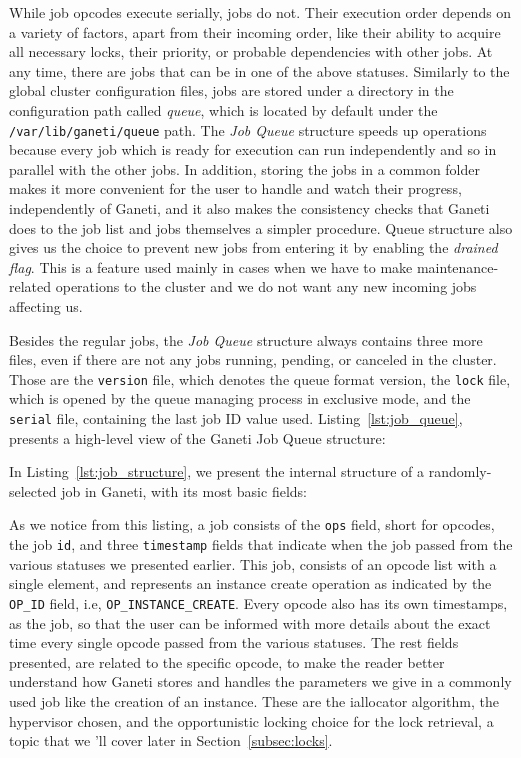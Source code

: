 While job opcodes execute serially, jobs do not. Their execution order depends
on a variety of factors, apart from their incoming order, like their ability to
acquire all necessary locks, their priority, or probable dependencies with
other jobs. At any time, there are jobs that can be in one of the above
statuses. Similarly to the global cluster configuration files, jobs are stored
under a directory in the configuration path called \emph{queue}, which is
located by default under the \texttt{/var/lib/ganeti/queue} path.
The \emph{Job Queue} structure speeds
up operations because every job which is ready for execution can run
independently and so in parallel with the other jobs. In addition, storing
the jobs in a common folder makes it more convenient for the user to handle
and watch their progress, independently of Ganeti, and it also makes the
consistency checks that Ganeti does to the job list and jobs themselves a
simpler procedure. Queue structure also gives us the choice to prevent new
jobs from entering it by enabling the \emph{drained flag}. This is a feature
used mainly in cases when we have to make maintenance-related operations to
the cluster and we do not want any new incoming jobs affecting us.

Besides the regular jobs, the \emph{Job Queue} structure always contains three
more files, even if there are not any jobs running, pending, or canceled in
the cluster. Those are the \texttt{version} file, which denotes the queue
format version, the \texttt{lock} file, which is opened by the queue managing
process in exclusive mode, and the \texttt{serial} file, containing the last
job ID value used. Listing~\ref{lst:job_queue}, presents a high-level view of
the Ganeti Job Queue structure:


In Listing~\ref{lst:job_structure}, we present the internal structure of a
randomly-selected job in Ganeti, with its most basic fields:


As we notice from this listing, a job consists of the \texttt{ops} field, short
for opcodes, the job \texttt{id}, and three \texttt{timestamp} fields that
indicate when the job passed from the various statuses we presented earlier.
This job, consists of an opcode list with a single element, and
represents an instance create operation as indicated by the \texttt{OP\_ID}
field, i.e, \texttt{OP\_INSTANCE\_CREATE}. Every opcode also has its own
timestamps, as the job, so that the user can be informed with more details
about the exact time every single opcode passed from the various statuses.
The rest fields presented, are related to the specific opcode, to make the
reader better understand how Ganeti stores and handles the parameters we
give in a commonly used job like the creation of an instance. These are
the iallocator algorithm, the hypervisor chosen, and the opportunistic
locking choice for the lock retrieval, a topic that we 'll cover later in
Section~\ref{subsec:locks}.

